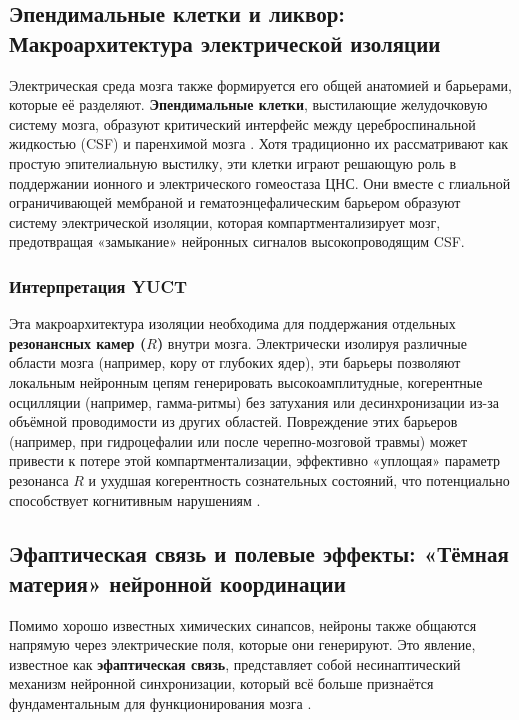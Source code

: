 \documentclass[12pt,a4paper]{article}
\begin{document}
	\subsection{Эпендимальные клетки и ликвор: Макроархитектура электрической изоляции}
	
	Электрическая среда мозга также формируется его общей анатомией и барьерами, которые её разделяют. \textbf{Эпендимальные клетки}, выстилающие желудочковую систему мозга, образуют критический интерфейс между цереброспинальной жидкостью (CSF) и паренхимой мозга \cite{DelBigio2010}. Хотя традиционно их рассматривают как простую эпителиальную выстилку, эти клетки играют решающую роль в поддержании ионного и электрического гомеостаза ЦНС. Они вместе с глиальной ограничивающей мембраной и гематоэнцефалическим барьером образуют систему электрической изоляции, которая компартментализирует мозг, предотвращая «замыкание» нейронных сигналов высокопроводящим CSF.
	
	\subsubsection*{Интерпретация YUCT}
	Эта макроархитектура изоляции необходима для поддержания отдельных \textbf{резонансных камер (\(R\))} внутри мозга. Электрически изолируя различные области мозга (например, кору от глубоких ядер), эти барьеры позволяют локальным нейронным цепям генерировать высокоамплитудные, когерентные осцилляции (например, гамма-ритмы) без затухания или десинхронизации из-за объёмной проводимости из других областей. Повреждение этих барьеров (например, при гидроцефалии или после черепно-мозговой травмы) может привести к потере этой компартментализации, эффективно «уплощая» параметр резонанса \(R\) и ухудшая когерентность сознательных состояний, что потенциально способствует когнитивным нарушениям \cite{Krishnamurthy2012}.
	
	\subsection{Эфаптическая связь и полевые эффекты: «Тёмная материя» нейронной координации}
	
	Помимо хорошо известных химических синапсов, нейроны также общаются напрямую через электрические поля, которые они генерируют. Это явление, известное как \textbf{эфаптическая связь}, представляет собой несинаптический механизм нейронной синхронизации, который всё больше признаётся фундаментальным для функционирования мозга \cite{Jefferys1995, Anastassiou2011}.
	
\end{document}
